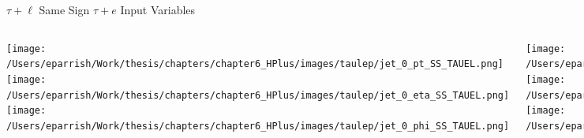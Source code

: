 \documentclass[aspectratio=169,xcolor=table]{beamer}
\begin{document}
    \begin{frame}[t]{$\tau+\ell$ Same Sign $\tau+e$ Input Variables}
      \begin{columns}[t]
          \texttt{[image: /Users/eparrish/Work/thesis/chapters/chapter6\_HPlus/images/taulep/jet\_0\_pt\_SS\_TAUEL.png]}
          \texttt{[image: /Users/eparrish/Work/thesis/chapters/chapter6\_HPlus/images/taulep/jet\_0\_eta\_SS\_TAUEL.png]}
          \texttt{[image: /Users/eparrish/Work/thesis/chapters/chapter6\_HPlus/images/taulep/jet\_0\_phi\_SS\_TAUEL.png]}

          \texttt{[image: /Users/eparrish/Work/thesis/chapters/chapter6\_HPlus/images/taulep/lep\_0\_pt\_SS\_TAUEL.png]}
          \texttt{[image: /Users/eparrish/Work/thesis/chapters/chapter6\_HPlus/images/taulep/lep\_0\_eta\_SS\_TAUEL.png]}
          \texttt{[image: /Users/eparrish/Work/thesis/chapters/chapter6\_HPlus/images/taulep/lep\_0\_phi\_SS\_TAUEL.png]}

          \texttt{[image: /Users/eparrish/Work/thesis/chapters/chapter6\_HPlus/images/taulep/el\_0\_pt\_SS\_TAUEL.png]}
          \texttt{[image: /Users/eparrish/Work/thesis/chapters/chapter6\_HPlus/images/taulep/el\_0\_eta\_SS\_TAUEL.png]}
          \texttt{[image: /Users/eparrish/Work/thesis/chapters/chapter6\_HPlus/images/taulep/el\_0\_phi\_SS\_TAUEL.png]}

          \texttt{[image: /Users/eparrish/Work/thesis/chapters/chapter6\_HPlus/images/taulep/mu\_0\_pt\_SS\_TAUEL.png]}
          \texttt{[image: /Users/eparrish/Work/thesis/chapters/chapter6\_HPlus/images/taulep/mu\_0\_eta\_SS\_TAUEL.png]}
          \texttt{[image: /Users/eparrish/Work/thesis/chapters/chapter6\_HPlus/images/taulep/mu\_0\_phi\_SS\_TAUEL.png]}

      \end{columns}
    \end{frame}
\end{document}
